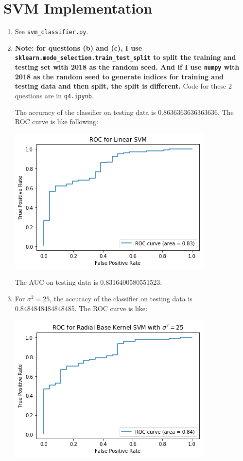 \documentclass[paper=letter, fontsize=12pt]{article}
\begin{document}
\section{SVM Implementation}
\begin{enumerate}[label=(\alph*)]
	\item See \texttt{svm\_classifier.py}.
	
	\item \textbf{Note: for questions (b) and (c), I use \texttt{sklearn.mode\_selection.train\_test\_split} to split the training and testing set with 2018 as the random seed. And if I use \texttt{numpy} with 2018 as the random seed to generate indices for training and testing data and then split, the split is different.} Code for these 2 questions are in \texttt{q4.ipynb}.
	
	The accuracy of the classifier on testing data is 0.8636363636363636. The ROC curve is like following:
	
	\includegraphics[scale=0.6]{q4b.png}
	
	The AUC on testing data is 0.8316400580551523.
	
	\item For $\sigma^2 = 25$, the accuracy of the classifier on testing data is 0.8484848484848485. The ROC curve is like:
	
	\includegraphics[scale=0.6]{q4c1.png}
	

\end{enumerate}
\end{document}
